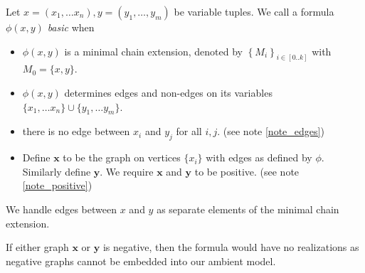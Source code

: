 \documentclass{amsart}
\newcommand{\curly}[1]{\left\{#1\right\}}
\begin{document}
\begin{Definition}
	Let $x = (x_1, \ldots x_n), y = (y_1, \ldots, y_m)$ be variable tuples.
	We call a formula $\phi(x, y)$ \emph{basic} when
	\begin{itemize}
		\item $\phi(x, y)$ is a minimal chain extension, denoted by $\curly{M_i}_{i \in [0..k]}$ with $M_0 = \{x, y\}$.
		\item $\phi(x, y)$ determines edges and non-edges on its variables $\{x_1, \ldots x_n\} \cup \{y_1, \ldots y_m\}$.
		\item there is no edge between $x_i$ and $y_j$ for all $i,j$. (see note \ref{note_edges})
		\item Define $\mathbf x$ to be the graph on vertices $\{x_i\}$ with edges as defined by $\phi$.
		Similarly define $\mathbf y$.
		We require $\mathbf x$ and $\mathbf y$ to be positive. (see note \ref{note_positive})\
	\end{itemize}
\end{Definition}




\begin{Note} \label{note_edges}
	We handle edges between $x$ and $y$ as separate elements of the minimal chain extension.
\end{Note}

\begin{Note} \label{note_positive}
	If either graph $\mathbf x$ or $\mathbf y$ is negative, then the formula would have no realizations as negative graphs cannot be embedded into our ambient model.
\end{Note}

\end{document}
